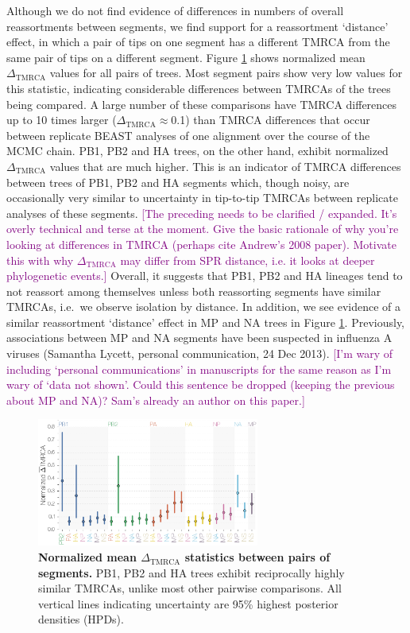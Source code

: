 \documentclass[11pt,oneside,letterpaper]{article}
\def\tbc#1{\textcolor{purple}{[#1]}}
\newcommand{\dtmrca}{\Delta_\mathrm{TMRCA}}
\begin{document}
Although we do not find evidence of differences in numbers of overall reassortments between segments, we find support for a reassortment `distance' effect, in which a pair of tips on one segment has a different TMRCA from the same pair of tips on a different segment.
Figure \ref{deltaTMRCA} shows normalized mean $\dtmrca$ values for all pairs of trees.
Most segment pairs show very low values for this statistic, indicating considerable differences between TMRCAs of the trees being compared.
A large number of these comparisons have TMRCA differences up to 10 times larger ($\dtmrca$$\approx$0.1) than TMRCA differences that occur between replicate BEAST analyses of one alignment over the course of the MCMC chain.
PB1, PB2 and HA trees, on the other hand, exhibit normalized $\dtmrca$ values that are much higher.
This is an indicator of TMRCA differences between trees of PB1, PB2 and HA segments which, though noisy, are occasionally very similar to uncertainty in tip-to-tip TMRCAs between replicate analyses of these segments.
\tbc{The preceding needs to be clarified / expanded.  It's overly technical and terse at the moment.  Give the basic rationale of why you're looking at differences in TMRCA (perhaps cite Andrew's 2008 paper).  Motivate this with why $\dtmrca$ may differ from SPR distance, i.e. it looks at deeper phylogenetic events.}
Overall, it suggests that PB1, PB2 and HA lineages tend to not reassort among themselves unless both reassorting segments have similar TMRCAs, i.e.\ we observe isolation by distance.
In addition, we see evidence of a similar reassortment `distance' effect in MP and NA trees in Figure \ref{deltaTMRCA}.
Previously, associations between MP and NA segments have been suspected in influenza A viruses (Samantha Lycett, personal communication, 24 Dec 2013).
\tbc{I'm wary of including `personal communications' in manuscripts for the same reason as I'm wary of `data not shown'.  Could this sentence be dropped (keeping the previous about MP and NA)? Sam's already an author on this paper.}

\begin{figure}[h]
	\centering		
	\includegraphics[width=0.65\textwidth]{figures/InfB_normalizedMuDeltaTMRCA.png}
	\caption{\textbf{Normalized mean $\dtmrca$ statistics between pairs of segments.}
PB1, PB2 and HA trees exhibit reciprocally highly similar TMRCAs, unlike most other pairwise comparisons.
All vertical lines indicating uncertainty are 95\% highest posterior densities (HPDs).}
	\label{deltaTMRCA}
\end{figure}
\end{document}
